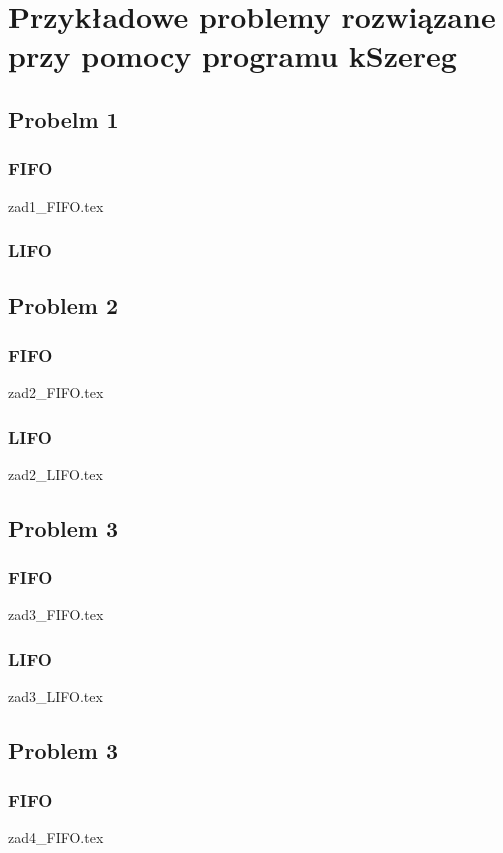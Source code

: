 \documentclass[twoside]{kInzynierka}
\begin{document}
   
\section        [Przykładowe problemy \ldots]
                {Przykładowe problemy \newlineTekst rozwiązane przy pomocy \newline programu kSzereg}
       
\subsection     {Probelm 1}
\subsubsection  {FIFO}
 {zad1_FIFO.tex}
\subsubsection  {LIFO}


\newpage
\subsection     {Problem 2}
\subsubsection  {FIFO}
 {zad2_FIFO.tex}
\subsubsection  {LIFO}
 {zad2_LIFO.tex}

\newpage
\subsection     {Problem 3}
\subsubsection  {FIFO}
 {zad3_FIFO.tex}
\subsubsection  {LIFO}
 {zad3_LIFO.tex}

\newpage
\subsection     {Problem 3}
\subsubsection  {FIFO}
 {zad4_FIFO.tex}
\end{document}
